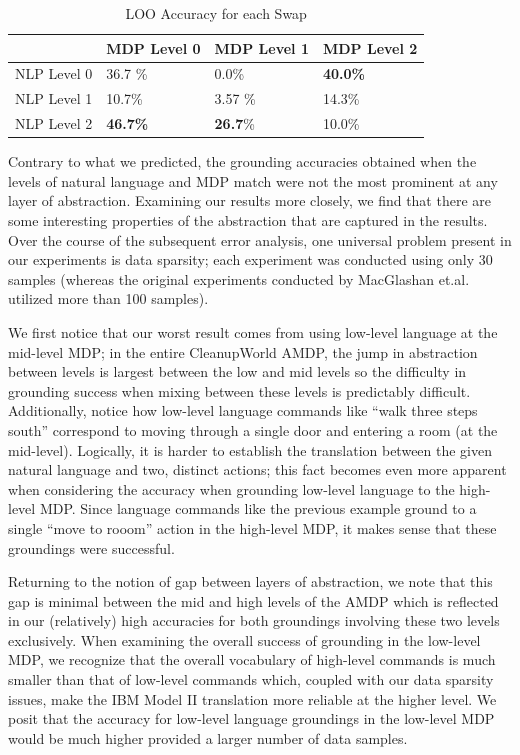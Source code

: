 \documentclass[conference]{IEEEtran}
\begin{document}
\begin{table}[h!]
\centering
\caption{LOO Accuracy for each Swap}
\label{my-label}
\begin{tabular}{l|l|l|l|}
\cline{2-4}
                                  & MDP Level 0 & MDP Level 1 & MDP Level 2 \\ \hline
\multicolumn{1}{|l|}{NLP Level 0} & 36.7 \%      & 0.0\%       & \textbf{40.0\%}       \\ \hline
\multicolumn{1}{|l|}{NLP Level 1} & 10.7\%       & 3.57 \%     & 14.3\%       \\ \hline
\multicolumn{1}{|l|}{NLP Level 2} & \textbf{46.7\%}       & \textbf{26.7}\%       & 10.0\%       \\ \hline
\end{tabular}
\end{table}

Contrary to what we predicted, the grounding accuracies obtained when the levels of natural language and MDP match were not the most prominent at any layer of abstraction. Examining our results more closely, we find that there are some interesting properties of the abstraction that are captured in the results. Over the course of the subsequent error analysis, one universal problem present in our experiments is data sparsity; each experiment was conducted using only 30 samples (whereas the original experiments conducted by MacGlashan et.al. utilized more than 100 samples). 

We first notice that our worst result comes from using low-level language at the mid-level MDP; in the entire CleanupWorld AMDP, the jump in abstraction between levels is largest between the low and mid levels so the difficulty in grounding success when mixing between these levels is predictably difficult. Additionally, notice how low-level language commands like ``walk three steps south'' correspond to moving through a single door and entering a room (at the mid-level). Logically, it is harder to establish the translation between the given natural language and two, distinct actions; this fact becomes even more apparent when considering the accuracy when grounding low-level language to the high-level MDP. Since language commands like the previous example ground to a single ``move to rooom'' action in the high-level MDP, it makes sense that these groundings were successful. 

Returning to the notion of gap between layers of abstraction, we note that this gap is minimal between the mid and high levels of the AMDP which is reflected in our (relatively) high accuracies for both groundings involving these two levels exclusively. When examining the overall success of grounding in the low-level MDP, we recognize that the overall vocabulary of high-level commands is much smaller than that of low-level commands which, coupled with our data sparsity issues, make the IBM Model II translation more reliable at the higher level. We posit that the accuracy for low-level language groundings in the low-level MDP would be much higher provided a larger number of data samples.
\end{document}
